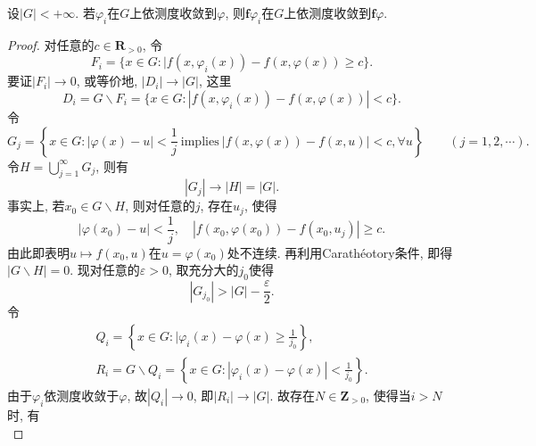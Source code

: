 \begin{lemma}\label{lma1.5}
    设$|G| < +\infty$. 若$\varphi_i$在$G$上依测度收敛到$\varphi$, 则$\bm{f}\varphi_i$在$G$上依测度收敛到$\bm{f}\varphi$.
    \begin{proof}
        对任意的$c \in \mathbf{R}_{> 0}$, 令 
        \begin{equation*}
            F_i = \{x \in G\colon |f(x, \varphi_i(x)) - f(x, \varphi(x)) \geq c\}.
        \end{equation*}
        要证$|F_i| \rightarrow 0$, 或等价地, $|D_i| \rightarrow |G|$, 这里
        \begin{equation*}
            D_i = G \smallsetminus F_i = \{x \in G\colon |f(x, \varphi_i(x)) - f(x, \varphi(x))| < c\}.
        \end{equation*}
        令 
        \begin{equation*}
            G_j = \left\{x \in G\colon |\varphi(x) - u| < \frac{1}{j}\ \text{implies}\ |f(x, \varphi(x)) - f(x, u)| < c, \forall u\right\} \qquad (j = 1, 2, \cdots).
        \end{equation*}
        令$H = \bigcup_{j = 1}^{\infty}G_j$, 则有 
        \begin{equation*}
            |G_j| \rightarrow |H| = |G|.
        \end{equation*}
        事实上, 若$x_0 \in G \smallsetminus H$, 则对任意的$j$, 存在$u_j$, 使得 
        \begin{equation*}
            |\varphi(x_0) - u| < \frac{1}{j}, \quad |f(x_0, \varphi(x_0)) - f(x_0, u_j)| \geq c.
        \end{equation*}
        由此即表明$u \mapsto f(x_0, u)$在$u = \varphi(x_0)$处不连续. 再利用Carath\'eotory条件, 即得$|G \smallsetminus H| = 0$. 现对任意的$\varepsilon > 0$, 取充分大的$j_0$使得 
        \begin{equation*}
            |G_{j_0}| > |G| - \frac{\varepsilon}{2}.
        \end{equation*}
        令 
        \begin{gather*}
            Q_i = \left\{x \in G\colon |\varphi_i(x) - \varphi(x) \geq \frac{1}{j_0}\right\}, \\ 
            R_i = G \smallsetminus Q_i = \left\{x \in G\colon |\varphi_i(x) - \varphi(x)| < \frac{1}{j_0}\right\}.
        \end{gather*}
        由于$\varphi_i$依测度收敛于$\varphi$, 故$|Q_i| \rightarrow 0$, 即$|R_i| \rightarrow |G|$. 故存在$N \in \mathbf{Z}_{> 0}$, 使得当$i > N$时, 有 
        \begin{equation*}

\end{equation*}
\end{proof}
\end{lemma}
